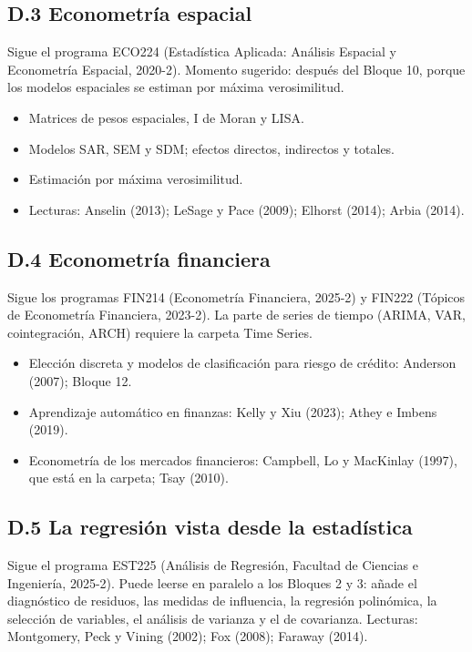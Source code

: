 \documentclass[11pt,a4paper]{article}
\begin{document}
\subsection*{D.3 Econometría espacial}
Sigue el programa ECO224 (Estadística Aplicada: Análisis Espacial y
Econometría Espacial, 2020-2). Momento sugerido: después del Bloque 10, porque
los modelos espaciales se estiman por máxima verosimilitud.
\begin{itemize}[leftmargin=1.4em,itemsep=1pt]
  \item Matrices de pesos espaciales, I de Moran y LISA.
  \item Modelos SAR, SEM y SDM; efectos directos, indirectos y totales.
  \item Estimación por máxima verosimilitud.
  \item Lecturas: Anselin (2013); LeSage y Pace (2009); Elhorst (2014); Arbia (2014).
\end{itemize}

\subsection*{D.4 Econometría financiera}
Sigue los programas FIN214 (Econometría Financiera, 2025-2) y FIN222
(Tópicos de Econometría Financiera, 2023-2). La parte de series de tiempo
(ARIMA, VAR, cointegración, ARCH) requiere la carpeta Time Series.
\begin{itemize}[leftmargin=1.4em,itemsep=1pt]
  \item Elección discreta y modelos de clasificación para riesgo de crédito:
        Anderson (2007); Bloque 12.
  \item Aprendizaje automático en finanzas: Kelly y Xiu (2023); Athey e
        Imbens (2019).
  \item Econometría de los mercados financieros: Campbell, Lo y MacKinlay
        (1997), que está en la carpeta; Tsay (2010).
\end{itemize}

\subsection*{D.5 La regresión vista desde la estadística}
Sigue el programa EST225 (Análisis de Regresión, Facultad de Ciencias e
Ingeniería, 2025-2). Puede leerse en paralelo a los Bloques 2 y 3: añade el
diagnóstico de residuos, las medidas de influencia, la regresión polinómica,
la selección de variables, el análisis de varianza y el de covarianza.
Lecturas: Montgomery, Peck y Vining (2002); Fox (2008); Faraway (2014).
\end{document}
